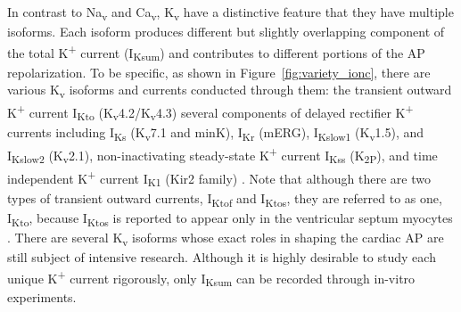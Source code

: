 \documentclass[utf8]{frontiersHLTH} %
\begin{document}
In contrast to Na\textsubscript{v} and Ca\textsubscript{v}, K\textsubscript{v} have a distinctive feature that they have multiple isoforms. Each isoform produces different but slightly overlapping component of the total K\textsuperscript{+} current (I\textsubscript{Ksum}) and contributes to different portions of the AP repolarization. To be specific, as shown in Figure~\ref{fig:variety_ionc}, there are various K\textsubscript{v} isoforms and currents conducted through them: the transient outward K\textsuperscript{+} current I\textsubscript{Kto} (K\textsubscript{v}4.2/K\textsubscript{v}4.3) several components of delayed rectifier K\textsuperscript{+} currents including I\textsubscript{Ks} (K\textsubscript{v}7.1 and minK), I\textsubscript{Kr} (mERG), I\textsubscript{Kslow1} (K\textsubscript{v}1.5), and I\textsubscript{Kslow2} (K\textsubscript{v}2.1), non-inactivating steady-state K\textsuperscript{+} current I\textsubscript{Kss} (K\textsubscript{2P}), and time independent K\textsuperscript{+} current I\textsubscript{K1} (Kir2 family) \cite{brouillette2004functional, liu2011dissection}. Note that although there are two types of transient outward currents, I\textsubscript{Ktof} and I\textsubscript{Ktos}, 
they are referred to as one, I\textsubscript{Kto}, because I\textsubscript{Ktos} is reported to appear only in the ventricular septum myocytes \cite{xu1999four}. There are several K\textsubscript{v} isoforms whose exact roles in shaping the cardiac AP are still subject of intensive research. Although it is highly desirable to study each unique K\textsuperscript{+} current rigorously, only I\textsubscript{Ksum} can be recorded through in-vitro experiments.
\end{document}
